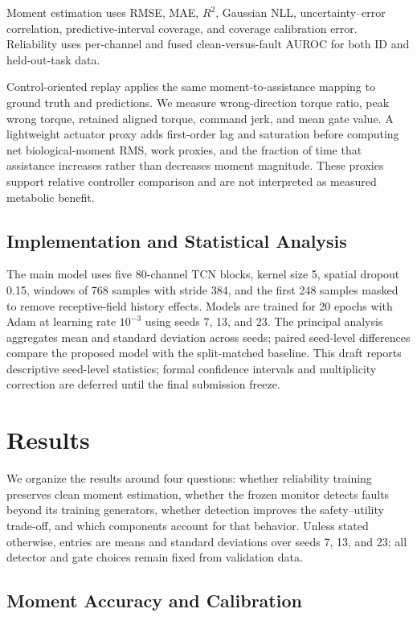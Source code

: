 \documentclass[letterpaper]{article} %
\begin{document}
Moment estimation uses RMSE, MAE, $R^2$, Gaussian NLL, uncertainty--error correlation, predictive-interval coverage, and coverage calibration error.
Reliability uses per-channel and fused clean-versus-fault AUROC for both ID and held-out-task data.

Control-oriented replay applies the same moment-to-assistance mapping to ground truth and predictions.
We measure wrong-direction torque ratio, peak wrong torque, retained aligned torque, command jerk, and mean gate value.
A lightweight actuator proxy adds first-order lag and saturation before computing net biological-moment RMS, work proxies, and the fraction of time that assistance increases rather than decreases moment magnitude.
These proxies support relative controller comparison and are not interpreted as measured metabolic benefit.

\subsection{Implementation and Statistical Analysis}

The main model uses five 80-channel TCN blocks, kernel size 5, spatial dropout 0.15, windows of 768 samples with stride 384, and the first 248 samples masked to remove receptive-field history effects.
Models are trained for 20 epochs with Adam at learning rate $10^{-3}$ using seeds 7, 13, and 23.
The principal analysis aggregates mean and standard deviation across seeds; paired seed-level differences compare the proposed model with the split-matched baseline.
This draft reports descriptive seed-level statistics; formal confidence intervals and multiplicity correction are deferred until the final submission freeze.

\section{Results}

We organize the results around four questions: whether reliability training preserves clean moment estimation, whether the frozen monitor detects faults beyond its training generators, whether detection improves the safety--utility trade-off, and which components account for that behavior.
Unless stated otherwise, entries are means and standard deviations over seeds 7, 13, and 23; all detector and gate choices remain fixed from validation data.

\subsection{Moment Accuracy and Calibration}
\end{document}
